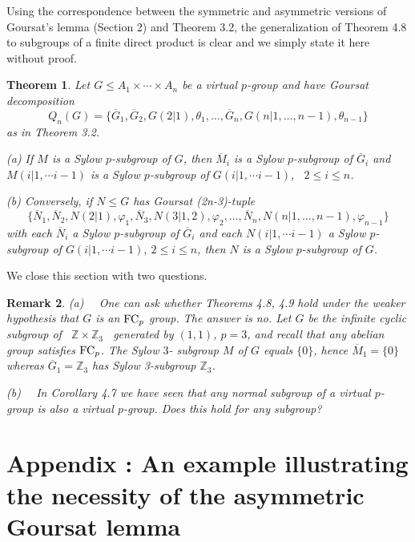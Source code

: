 \documentclass[11pt]{article}
\theoremstyle{change}
\newtheorem{Thm}{Theorem}[section]
\newtheorem{Rem}[Thm]{Remark}
\newcommand{\ZZ}{\mathbb {Z}}
\newcommand{\<}{\langle}
\renewcommand{\>}{\rangle}
\newcommand{\syl}{Sylow $p$-subgroup }
\begin{document}
Using the correspondence between the symmetric and asymmetric versions
of Goursat's lemma (Section 2) and Theorem 3.2, the generalization of 
Theorem 4.8 to subgroups of a finite direct product is clear and we
simply state it here without proof.

\begin{Thm}
Let $G \leq A_1\times\cdots\times A_n$ be a virtual $p$-group
 and have  Goursat decomposition 
$$ Q_n(G) =   \{\overline{G}_1,\overline{G}_2, G(2|1), \theta_1,
\ldots, \overline{G}_n, G(n|1,\ldots ,n-1), \theta_{n-1}  \}  $$
as in Theorem 3.2. 

(a) If $M$ is a \syl  of $G$, then 
$\overline{M}_i$ is a \syl of 
$\overline{G}_i$ and $M(i|1,\cdots i-1)$ is a \syl of $G(i|1,\cdots i-1)$,
\ $2\leq i\leq n$.

(b)  Conversely, if $N \leq G$ has Goursat (2n-3)-tuple  
$$   \{\overline{N}_1,\overline{N}_2, N(2|1), \varphi_1,\overline{N}_3, N(3|1,2), \varphi_2 ,
\ldots, \overline{N}_n, N(n|1,\ldots ,n-1), \varphi_{n-1}  \}  $$
with each 
$\overline{N}_i$  a \syl of 
$\overline{G}_i$ and each $N(i|1,\cdots i-1)$  a \syl of $G(i|1,\cdots i-1),
\ 2\leq i\leq n$, then $N$ is a \syl of $G$.
\end{Thm}

We close this section with two questions.
\begin{Rem}
(a) \ \ One can ask whether Theorems 4.8, 4.9 hold under the weaker hypothesis
that $G$ is an ${\rm FC}_p$ group. The answer is {\it no}. Let $G$ be the
infinite cyclic subgroup of \ $\ZZ\times \ZZ_3$ \ generated by $(1,1)$, $p=3$,
and recall that any abelian group satisfies ${\rm FC}_p$. The Sylow $3$-
subgroup $M$ of $G$ equals $\{ 0\}$, hence $\overline{M}_1 = \{ 0\}$ whereas
$\overline{G}_1 = \ZZ_3$ has Sylow 3-subgroup $\ZZ_3$.

(b) \ \ In Corollary 4.7 we have seen that any normal subgroup of a virtual
$p$-group is also a virtual $p$-group. Does this hold for any subgroup?





\end{Rem}




\section{Appendix : An example illustrating the necessity of the asymmetric Goursat lemma}\label{s:Appendix}
\end{document}
